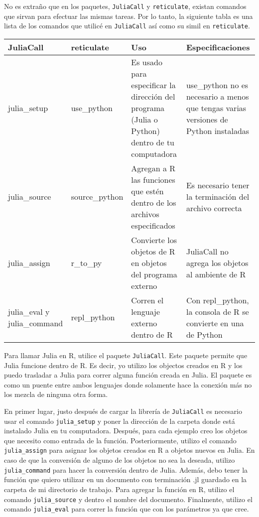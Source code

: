No es extraño que en los paquetes, \texttt{JuliaCall} y \texttt{reticulate}, existan comandos que sirvan para efectuar las mismas tareas. Por lo tanto, la siguiente tabla es una lista de los comandos que utilicé en \texttt{JuliaCall} así como su simil en \texttt{reticulate}.

\begin{tabular}{ |p{2cm}|p{2.5cm}|p{3cm}|p{3cm}|  }
	\hline
	JuliaCall & reticulate & Uso & Especificaciones\\
	\hline
	julia\_setup   & use\_python    & Es usado para especificar la dirección del programa (Julia o Python) dentro de tu computadora &   use\_python no es necesario a menos que tengas varias versiones de Python instaladas\\
	\hline
	julia\_source &   source\_python  & Agregan a R las funciones que estén dentro de los archivos especificados   & Es necesario tener la terminación del archivo correcta\\
	\hline
	julia\_assign & r\_to\_py &  Convierte los objetos de R en objetos del programa externo &  JuliaCall no agrega los objetos al ambiente de R\\
	\hline
	julia\_eval y julia\_command  & repl\_python\(\) & Corren el lenguaje externo dentro de R&  Con repl\_python, la consola de R se convierte en una de Python\\

	\hline
\end{tabular}


Para llamar Julia en R, utilice el paquete \texttt{JuliaCall}. Este paquete permite que Julia funcione dentro de R. Es decir, yo utilizo los objectos creados en R y los puedo trasladar a Julia para correr alguna función creada en Julia. El paquete es como un puente entre ambos lenguajes donde solamente hace la conexión más no los mezcla de ninguna otra forma.

En primer lugar, justo después de cargar la librería de \texttt{JuliaCall} es necesario usar el comando \texttt{julia\_setup} y poner la dirección de la carpeta donde está instalado Julia en tu computadora. Después, para cada ejemplo creo los objetos que necesito como entrada de la función. Posteriormente, utilizo el comando \texttt{julia\_assign} para asignar los objetos creados en R a objetos nuevos en Julia. En caso de que la conversión de alguno de los objetos no sea la deseada, utilizo \texttt{julia\_command} para hacer la conversión dentro de Julia. Además, debo tener la función que quiero utilizar en un documento con terminación \textsf{.jl} guardado en la carpeta de mi directorio de trabajo. Para agregar la función en R, utilizo el comando \texttt{julia\_source} y dentro el nombre del documento. Finalmente, utilizo el comando \texttt{julia\_eval} para correr la función que con los parámetros ya que cree. 

